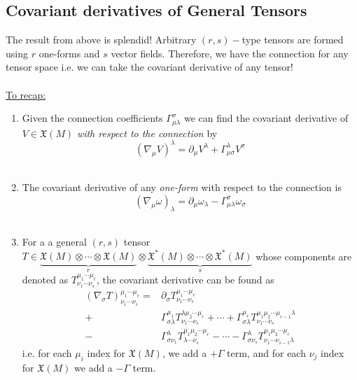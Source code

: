 \documentclass[11pt]{article}
\begin{document}
\subsection{Covariant derivatives of General Tensors}
The result from above is splendid! Arbitrary $(r,s)-$type tensors are formed using $r$ one-forms and $s$ vector fields. Therefore, we have the connection for any tensor space i.e. we can take the covariant derivative of any tensor!
\\
\\
\underline{To recap:}
\begin{enumerate}[label=(\alph*)]
  \item Given the connection coefficients $\Gamma_{\mu \lambda}^{\sigma}$ we can find the covariant derivative of $V \in \mathfrak{X}(M)$ \textit{with respect to the connection} by 
  \[ (\nabla_{\mu} V)^{\lambda} = \partial_{\mu} V^{\lambda} + \Gamma_{\mu \sigma}^{\lambda} V^{\sigma}  \]
  \\
  \item The covariant derivative of any \textit{one-form} with respect to the connection is 
  \[ (\nabla_{\mu} \omega)_{\lambda} = \partial_{\mu} \omega_{\lambda} - \Gamma_{\mu \lambda}^{\sigma} \omega_{\sigma} \]
  \\
  \item For a a general $(r,s)$ tensor $T \in \underbrace{\mathfrak{X}(M) \otimes \cdots \otimes \mathfrak{X}(M)}_{r} \otimes \underbrace{\mathfrak{X}^*(M) \otimes \cdots \otimes \mathfrak{X}^*(M)}_{s}$ 
  whose components are denoted as $T^{\mu_1 \cdots \mu_r}_{\nu_1 \cdots \nu_s}$, the covariant derivative can be found as 
  \begin{align*}
    \left(\nabla_{\sigma} T\right)^{\mu_1 \cdots \mu_r}_{\nu_1 \cdots \nu_s} = & \partial_{\sigma} T^{\mu_1 \cdots \mu_r}_{\nu_1 \cdots \nu_s} \\ + &\Gamma_{\sigma \lambda}^{\mu_1}T^{\lambda \mu_2 \cdots \mu_r}_{\nu_1 \cdots \nu_s} + \cdots + \Gamma_{\sigma \lambda}^{\mu_r}T^{\mu_1 \mu_2 \cdots \mu_{r-1} \lambda}_{\nu_1 \cdots \nu_s} \\ - &\Gamma_{\sigma \nu_1}^{\lambda}T^{\mu_1 \mu_2 \cdots \mu_r}_{\lambda \cdots \nu_s} - \cdots - \Gamma_{\sigma \nu_s}^{\lambda}T^{\mu_1 \mu_2 \cdots \mu_r}_{\nu_1 \cdots \nu_{s-1} \lambda} 
  \end{align*}
  i.e. for each $\mu_i$ index for $\mathfrak{X}(M)$, we add a $+\Gamma$ term, and for each $\nu_j$ index for $\mathfrak{X}(M)$ we add a $-\Gamma$ term. 



\end{enumerate}
\end{document}
